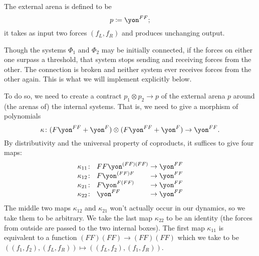 \documentclass[DynamicalBook]{subfiles}
\begin{document}
\begin{example}
The external arena is defined to be
\[
p\coloneqq\yon^{FF};
\]
it takes as input two forces $(f_L, f_R)$ and produces unchanging output.

Though the systems $\Phi_1$ and $\Phi_2$ may be initially connected, if the forces on either one surpass a threshold, that system stops sending and receiving forces from the other. The connection is broken and neither system ever receives forces from the other again. This is what we will implement explicitly below.

To do so, we need to create a contract $p_1\otimes p_2\to p$ of the external arena $p$ around (the arenas of) the internal systems. That is, we need to give a morphism of polynomials
\[
\kappa\colon (F\yon^{FF}+\yon^F)\otimes (F\yon^{FF}+\yon^F)\to\yon^{FF}.
\]
By distributivity and the universal property of coproducts, it suffices to give four maps:
\[\arraycolsep=1.4pt
\begin{array}{lll}
	\kappa_{11}\colon&~ FF\yon^{(FF)(FF)}&\to\yon^{FF}\\
	\kappa_{12}\colon&~ F\yon^{(FF)F}&\to\yon^{FF}\\
	\kappa_{21}\colon&~ F\yon^{F(FF)}&\to\yon^{FF}\\
	\kappa_{22}\colon&~ \yon^{FF}&\to\yon^{FF}
\end{array}
\]
The middle two maps $\kappa_{12}$ and $\kappa_{21}$ won't actually occur in our dynamics, so we take them to be arbitrary. We take the last map $\kappa_{22}$ to be an identity (the forces from outside are passed to the two internal boxes). The first map $\kappa_{11}$ is equivalent to a function $(FF)(FF)\to (FF)(FF)$ which we take to be $((f_1,f_2),(f_L,f_R))\mapsto((f_L, f_2),(f_1,f_R))$.


\end{example}
\end{document}
